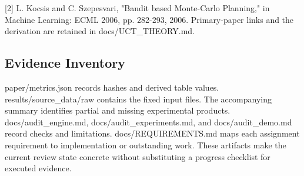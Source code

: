 \documentclass[conference]{IEEEtran}
\begin{document}
[2] L. Kocsis and C. Szepesvari, "Bandit based Monte-Carlo Planning," in Machine Learning: ECML 2006, pp. 282-293, 2006. Primary-paper links and the derivation are retained in docs/UCT\_THEORY.md.


\subsection{Evidence Inventory}

paper/metrics.json records hashes and derived table values. results/source\_data/raw contains the fixed input files. The accompanying summary identifies partial and missing experimental products. docs/audit\_engine.md, docs/audit\_experiments.md, and docs/audit\_demo.md record checks and limitations. docs/REQUIREMENTS.md maps each assignment requirement to implementation or outstanding work. These artifacts make the current review state concrete without substituting a progress checklist for executed evidence.
\end{document}

